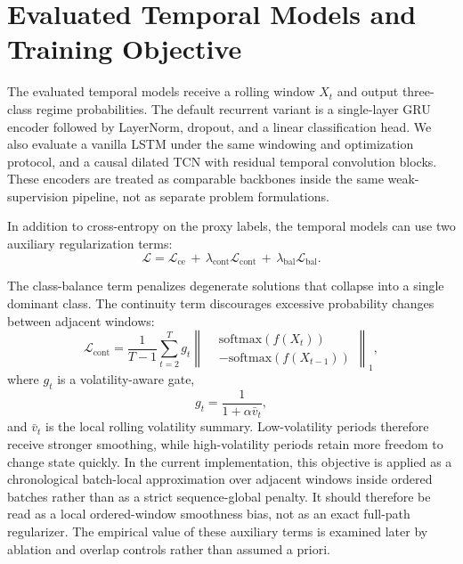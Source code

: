 \documentclass[a4paper,fleqn]{cas-dc}
\begin{document}
\section{Evaluated Temporal Models and Training Objective}
The evaluated temporal models receive a rolling window $X_t$ and output three-class regime probabilities. The default recurrent variant is a single-layer GRU encoder followed by LayerNorm, dropout, and a linear classification head. We also evaluate a vanilla LSTM under the same windowing and optimization protocol, and a causal dilated TCN with residual temporal convolution blocks. These encoders are treated as comparable backbones inside the same weak-supervision pipeline, not as separate problem formulations.

In addition to cross-entropy on the proxy labels, the temporal models can use two auxiliary regularization terms:
\begin{equation}
\mathcal{L}
=
\mathcal{L}_{\mathrm{ce}}
\,+\,
\lambda_{\mathrm{cont}}\mathcal{L}_{\mathrm{cont}}
\,+\,
\lambda_{\mathrm{bal}}\mathcal{L}_{\mathrm{bal}}.
\end{equation}

The class-balance term penalizes degenerate solutions that collapse into a single dominant class. The continuity term discourages excessive probability changes between adjacent windows:
\begin{equation}
\mathcal{L}_{\mathrm{cont}}
=
\frac{1}{T-1}
\sum_{t=2}^{T}
g_t
\left\|
\begin{aligned}
&\mathrm{softmax}(f(X_t))\\
&-\mathrm{softmax}(f(X_{t-1}))
\end{aligned}
\right\|_1,
\end{equation}
where $g_t$ is a volatility-aware gate,
\begin{equation}
g_t = \frac{1}{1 + \alpha \bar{v}_t},
\end{equation}
and $\bar{v}_t$ is the local rolling volatility summary. Low-volatility periods therefore receive stronger smoothing, while high-volatility periods retain more freedom to change state quickly. In the current implementation, this objective is applied as a chronological batch-local approximation over adjacent windows inside ordered batches rather than as a strict sequence-global penalty. It should therefore be read as a local ordered-window smoothness bias, not as an exact full-path regularizer. The empirical value of these auxiliary terms is examined later by ablation and overlap controls rather than assumed a priori.
\end{document}
